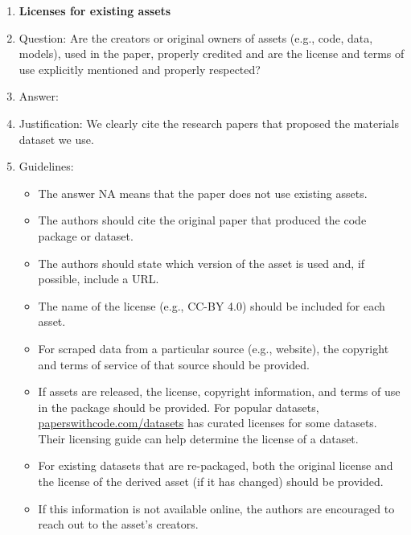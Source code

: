 \documentclass{article}
\theoremstyle{plain}
\theoremstyle{definition}
\theoremstyle{remark}
\theoremstyle{plain}
\begin{document}
\begin{enumerate}
\item {\bf Licenses for existing assets}
    \item[] Question: Are the creators or original owners of assets (e.g., code, data, models), used in the paper, properly credited and are the license and terms of use explicitly mentioned and properly respected?
    \item[] Answer: \answerYes{} %
    \item[] Justification: We clearly cite the research papers that proposed the materials dataset we use.
    \item[] Guidelines:
    \begin{itemize}
        \item The answer NA means that the paper does not use existing assets.
        \item The authors should cite the original paper that produced the code package or dataset.
        \item The authors should state which version of the asset is used and, if possible, include a URL.
        \item The name of the license (e.g., CC-BY 4.0) should be included for each asset.
        \item For scraped data from a particular source (e.g., website), the copyright and terms of service of that source should be provided.
        \item If assets are released, the license, copyright information, and terms of use in the package should be provided. For popular datasets, \url{paperswithcode.com/datasets} has curated licenses for some datasets. Their licensing guide can help determine the license of a dataset.
        \item For existing datasets that are re-packaged, both the original license and the license of the derived asset (if it has changed) should be provided.
        \item If this information is not available online, the authors are encouraged to reach out to the asset's creators.
    \end{itemize}


\end{enumerate}
\end{document}
